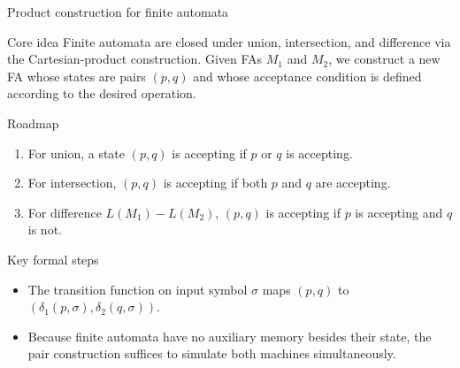 \begin{frame}[t]{Product construction for finite automata}
  \begin{tblock}{Core idea}
    Finite automata are closed under union, intersection, and difference
    via the Cartesian‑product construction.  Given FAs $M_1$ and $M_2$, we
    construct a new FA whose states are pairs $(p,q)$ and whose
    acceptance condition is defined according to the desired operation.
  \end{tblock}
  \begin{tblock}{Roadmap}
    \begin{enumerate}
      \item For union, a state $(p,q)$ is accepting if $p$ or $q$ is
        accepting.
      \item For intersection, $(p,q)$ is accepting if both $p$ and $q$
        are accepting.
      \item For difference $L(M_1) - L(M_2)$, $(p,q)$ is accepting if
        $p$ is accepting and $q$ is not.
    \end{enumerate}
  \end{tblock}
  \begin{tblock}{Key formal steps}
    \begin{itemize}
      \item The transition function on input symbol $\sigma$ maps
        $(p,q)$ to $(\delta_1(p,\sigma),\delta_2(q,\sigma))$.
      \item Because finite automata have no auxiliary memory besides
        their state, the pair construction suffices to simulate both
        machines simultaneously.
    \end{itemize}
  \end{tblock}
  \label{fr:6.2-11}
\end{frame}

